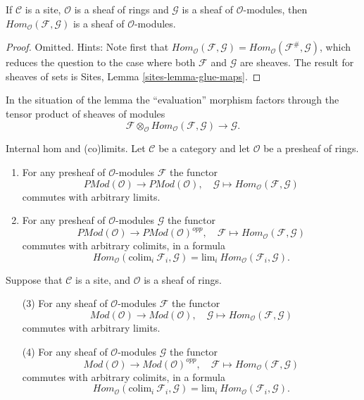 \begin{lemma}
\label{lemma-internal-hom}
If $\mathcal{C}$ is a site, $\mathcal{O}$ is a sheaf of rings
and $\mathcal{G}$ is a sheaf of $\mathcal{O}$-modules, then
$\textit{Hom}_{\mathcal{O}}(\mathcal{F}, \mathcal{G})$
is a sheaf of $\mathcal{O}$-modules.
\end{lemma}

\begin{proof}
Omitted. Hints: Note first that
$\textit{Hom}_{\mathcal{O}}(\mathcal{F}, \mathcal{G})
= \textit{Hom}_{\mathcal{O}}(\mathcal{F}^\#, \mathcal{G})$, which reduces
the question to the case where both $\mathcal{F}$ and $\mathcal{G}$
are sheaves. The result for sheaves of sets is
Sites, Lemma \ref{sites-lemma-glue-maps}.
\end{proof}

\noindent
In the situation of the lemma the ``evaluation'' morphism
factors through the tensor product of sheaves of modules
$$
\mathcal{F}
\otimes_\mathcal{O}
\textit{Hom}_{\mathcal{O}}(\mathcal{F}, \mathcal{G})
\longrightarrow
\mathcal{G}.
$$

\begin{lemma}
\label{lemma-internal-hom-commute-limits}
Internal hom and (co)limits.
Let $\mathcal{C}$ be a category and let $\mathcal{O}$ be a presheaf of rings.
\begin{enumerate}
\item For any presheaf of $\mathcal{O}$-modules $\mathcal{F}$ the functor
$$
\textit{PMod}(\mathcal{O}) \longrightarrow \textit{PMod}(\mathcal{O})
,\quad
\mathcal{G} \longmapsto \textit{Hom}_{\mathcal{O}}(\mathcal{F}, \mathcal{G})
$$
commutes with arbitrary limits.
\item For any presheaf of $\mathcal{O}$-modules $\mathcal{G}$ the functor
$$
\textit{PMod}(\mathcal{O}) \longrightarrow \textit{PMod}(\mathcal{O})^{opp}
,\quad
\mathcal{F} \longmapsto \textit{Hom}_{\mathcal{O}}(\mathcal{F}, \mathcal{G})
$$
commutes with arbitrary colimits, in a formula
$$
\textit{Hom}_{\mathcal{O}}(\text{colim}_i\ \mathcal{F}_i, \mathcal{G})
=
\text{lim}_i\ \textit{Hom}_{\mathcal{O}}(\mathcal{F}_i, \mathcal{G}).
$$
\end{enumerate}
Suppose that $\mathcal{C}$ is a site, and $\mathcal{O}$ is a sheaf of rings.
\begin{enumerate}
\item[(3)] For any sheaf of $\mathcal{O}$-modules $\mathcal{F}$ the functor
$$
\textit{Mod}(\mathcal{O}) \longrightarrow \textit{Mod}(\mathcal{O})
,\quad
\mathcal{G} \longmapsto \textit{Hom}_{\mathcal{O}}(\mathcal{F}, \mathcal{G})
$$
commutes with arbitrary limits.
\item[(4)] For any sheaf of $\mathcal{O}$-modules $\mathcal{G}$ the functor
$$
\textit{Mod}(\mathcal{O}) \longrightarrow \textit{Mod}(\mathcal{O})^{opp}
,\quad
\mathcal{F} \longmapsto \textit{Hom}_{\mathcal{O}}(\mathcal{F}, \mathcal{G})
$$
commutes with arbitrary colimits, in a formula
$$
\textit{Hom}_{\mathcal{O}}(\text{colim}_i\ \mathcal{F}_i, \mathcal{G})
=
\text{lim}_i\ \textit{Hom}_{\mathcal{O}}(\mathcal{F}_i, \mathcal{G}).
$$
\end{enumerate}
\end{lemma}

